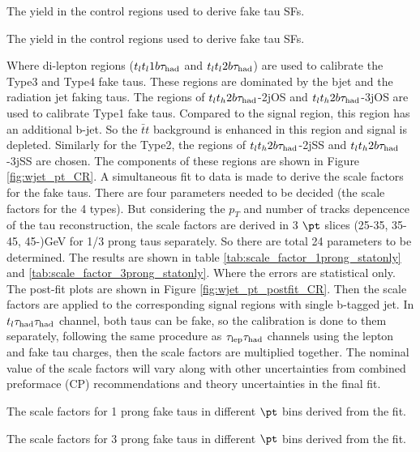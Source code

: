 \begin{table}
\caption{The yield in the control regions used to derive fake tau SFs.}
\label{tab:SFCR_yield}

\end{table}
\begin{table}
\caption{The yield in the control regions used to derive fake tau SFs.}
\label{tab:SFCR_yield_1}

\end{table}

Where di-lepton regions ($t_lt_l1b\tau_\text{had}$ and $t_lt_l2b\tau_\text{had}$) are used to calibrate the Type3 and Type4 fake taus. These regions are dominated by the bjet and the radiation jet faking taus. The regions of
$t_lt_h2b\tau_\text{had}$-2jOS and $t_lt_h2b\tau_\text{had}$-3jOS are used to calibrate Type1 fake taus. Compared to the signal region, this region has an additional b-jet. So the $\bar{t}t$ background is enhanced in this region and signal is depleted. Similarly for the Type2, the regions of $t_lt_h2b\tau_\text{had}$-2jSS and $t_lt_h2b\tau_\text{had}$-3jSS are chosen. The components of these regions are shown in Figure \ref{fig:wjet_pt_CR}. A simultaneous fit to data is made to derive the scale factors for the fake taus. There are four parameters needed to be decided (the scale factors for the 4 types). But considering the $p_{T}$ and number of tracks depencence of the tau reconstruction, the scale factors are derived in 3 $\pt$ slices (25-35, 35-45, 45-)GeV for 1/3 prong taus separately. So there are total 24 parameters to be determined. The results are shown in table \ref{tab:scale_factor_1prong_statonly} and \ref{tab:scale_factor_3prong_statonly}. Where the errors are statistical only. The post-fit plots are shown in Figure \ref{fig:wjet_pt_postfit_CR}. Then the scale factors are applied to the corresponding signal regions with single b-tagged jet. In $t_l\tau_\text{had}{}\tau_\text{had}$ channel, both taus can be fake, so the calibration is done to them separately, following the same procedure as $\tau_\text{lep}{}\tau_\text{had}$ channels using the lepton and fake tau charges, then the scale factors are multiplied together. The nominal value of the scale factors will vary along with other uncertainties from combined preformace (CP) recommendations and theory uncertainties in the final fit.




\begin{table}
\caption{The scale factors for 1 prong fake taus in different $\pt$ bins derived from the fit.}
\label{tab:scale_factor_1prong_statonly}

\end{table}
\begin{table}
\caption{The scale factors for 3 prong fake taus in different $\pt$ bins derived from the fit.}
\label{tab:scale_factor_3prong_statonly}

\end{table}


